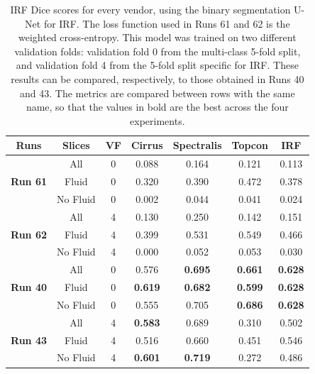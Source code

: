 \begin{table}[!ht]
	\caption{IRF Dice scores for every vendor, using the binary segmentation U-Net for IRF. The loss function used in Runs 61 and 62 is the weighted cross-entropy. This model was trained on two different validation folds: validation fold 0 from the multi-class 5-fold split, and validation fold 4 from the 5-fold split specific for IRF. These results can be compared, respectively, to those obtained in Runs 40 and 43. The metrics are compared between rows with the same name, so that the values in bold are the best across the four experiments.}
	\centering
	\begin{tabular}{|c|c|c|c|c|c|c|}
			\hline
			\textbf{Runs} &
			\textbf{Slices} &  
			\textbf{VF} & 
			\textbf{Cirrus} & 
			\textbf{Spectralis} & 
			\textbf{Topcon} & 
			\textbf{IRF} \\ 
			
			\hline
			
			\multirow{3}{*}{\textbf{Run 61}} & All & 0 & 0.088 & 0.164 & 0.121 & 0.113 \\
			
			& Fluid & 0 & 0.320 & 0.390 & 0.472 & 0.378 \\
			
			& No Fluid & 0 & 0.002 & 0.044 & 0.041 & 0.024 \\
			
			\hline
			
			\multirow{3}{*}{\textbf{Run 62}} & All & 4 & 0.130 & 0.250 & 0.142 & 0.151 \\
			
			& Fluid & 4 & 0.399 & 0.531 & 0.549 & 0.466 \\
						
			& No Fluid & 4 & 0.000 & 0.052 & 0.053 & 0.030 \\
			
			\hline
			\hline
			
			\multirow{3}{*}{\textbf{Run 40}} & All & 0 & 0.576 & \textbf{0.695} & \textbf{0.661} & \textbf{0.628} \\
			
			& Fluid & 0 & \textbf{0.619} & \textbf{0.682} & \textbf{0.599} & \textbf{0.628} \\
			
			& No Fluid & 0 & 0.555 & 0.705 & \textbf{0.686} & \textbf{0.628} \\
			
			\hline
			
			\multirow{3}{*}{\textbf{Run 43}} & All & 4 & \textbf{0.583} & 0.689 & 0.310 & 0.502 \\
			
			& Fluid & 4 & 0.516 & 0.660 & 0.451 & 0.546 \\
			
			& No Fluid & 4 & \textbf{0.601} & \textbf{0.719} & 0.272 & 0.486 \\
			
			\hline
			
	\end{tabular}
	\label{tab:Experiment2.2Results}
\end{table}

